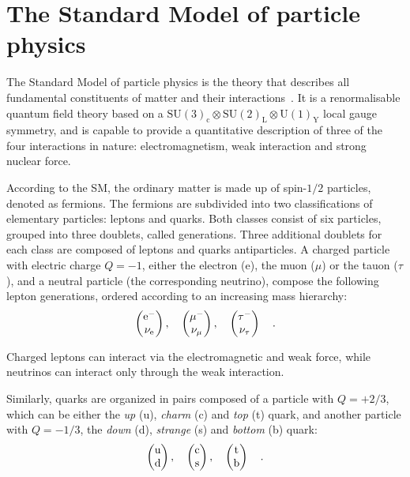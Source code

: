 \section{The Standard Model of particle physics}
\label{sec:SM}

The Standard Model of particle physics is the theory that describes all fundamental constituents of matter and their interactions~\cite{Halzen:1984mc}. It is a renormalisable quantum field theory based on a $\mathrm{SU(3)_c \otimes SU(2)_L \otimes U(1)_Y}$ local gauge symmetry, and is capable to provide a quantitative description of three of the four interactions in nature: electromagnetism, weak interaction and strong nuclear force. 

According to the SM, the ordinary matter is made up of spin-$1/2$ particles, denoted as fermions. The fermions are subdivided into two classifications of elementary particles: leptons and quarks. Both classes consist of six particles, grouped into three doublets, called generations. Three additional doublets for each class are composed of leptons and quarks antiparticles. A charged particle with electric charge $Q=-1$, either the electron (e), the muon ($\mu$) or the tauon ($\tau$), and a neutral particle (the corresponding neutrino), compose the following lepton generations, ordered according to an increasing mass hierarchy:
\begin{equation}
\label{eq:leptons}
\begin{pmatrix} \rm e^-       \\ \nu_{\rm e}      \end{pmatrix}, \quad
\begin{pmatrix} \mu^-     \\ \nu_{\mu}  \end{pmatrix}, \quad
\begin{pmatrix} \tau^-    \\ \nu_{\tau} \end{pmatrix}  \quad .
\end{equation}

Charged leptons can interact via the electromagnetic and weak force, while neutrinos can interact only through the weak interaction.

Similarly, quarks are organized in pairs composed of a particle with $Q=+2/3$, which can be either the \emph{up} (u), \emph{charm} (c) and \emph{top} (t) quark, and another particle with $Q=-1/3$, the \emph{down} (d), \emph{strange} (s) and \emph{bottom} (b) quark:
\begin{equation}
\label{eq:quarks}
\begin{pmatrix} \rm u       \\ \rm d      \end{pmatrix}, \quad
\begin{pmatrix} \rm c       \\ \rm s      \end{pmatrix}, \quad
\begin{pmatrix} \rm t       \\ \rm b      \end{pmatrix}  \quad .
\end{equation}

